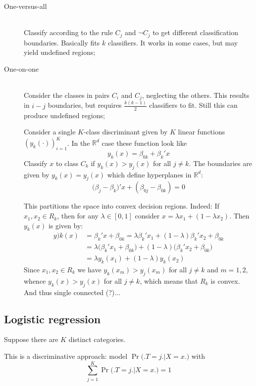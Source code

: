 \documentclass[a4paper]{article}
\newcommand{\clo}[1]{{\left [ #1 \right ]}}
\newcommand{\brac}[1]{{\left ( #1 \right )}}
\newcommand{\Real}{\mathbb{R}}
\begin{document}
\begin{description}
	\item[One-versus-all]\hfill\\
		Classify according to the rule $C_j$ and $\neg C_j$ to get different classification boundaries.
		Basically fits $k$ classifiers. It works in some cases, but may yield undefined regions;
	\item[One-on-one] \hfill\\
		Consider the classes in pairs $C_i$ and $C_j$, neglecting the others. This results in $i-j$ boundaries,
		but requires $\frac{k(k-1)}{2}$ classifiers to fit. Still this can produce undefined regions;
	\item[]
	Consider a single $K$-class discriminant given by $K$ linear functions $\brac{y_k(\cdot)}_{i=1}^K$.
	In the $\Real^d$ case these function look like 
	\[y_k(x) = \beta_{0k} + \beta_k'x\]
	Classify $x$ to class $C_k$ if $y_k(x) > y_j(x)$ for all $j\neq k$.
	The boundaries are given by $y_k(x) = y_j(x)$ which define hyperplanes in $\Real^d$:
	\[\big(\beta_j-\beta_k\big)'x + (\beta_{0j}-\beta_{0k}) = 0\]

	This partitions the space into convex decision regions. Indeed:
	If $x_1,x_2\in R_k$, then for any $\lambda\in \clo{0,1}$ consider $x = \lambda x_1 + (1-\lambda x_2)$.
	Then $y_k(x)$ is given by:
	\begin{align*}
		y)k(x) &= \beta_k'x +\beta_{0k} = \lambda\beta_k'x_1 + (1-\lambda)\beta_k'x_2 + \beta_{0k} \\
		& = \lambda\big(\beta_k'x_1 +\beta_{0k}\big) + (1-\lambda)\big(\beta_k'x_2 +\beta_{0k}\big) \\
		& = \lambda y_k(x_1) + (1-\lambda)y_k(x_2)
	\end{align*}
	Since $x_1, x_2\in R_k$ we have $y_k(x_m)>y_j(x_m)$ for all $j\neq k$ and $m=1,2$, whence
	$y_k(x) > y_j(x)$ for all $j\neq k$, which means that $R_k$ is convex. And thus single connected (?)...
\end{description}


\subsection{Logistic regression} %
\label{sub:logistic_regression}

Suppose there are $K$ distinct categories.

This is a discriminative approach: model $\Pr\big(\big. T=j\big.\big\rvert X=x\big.\big)$ with
\[\sum_{j=1}^K \Pr\big(\big. T=j\big.\big\rvert X=x\big.\big) = 1\]
\end{document}
